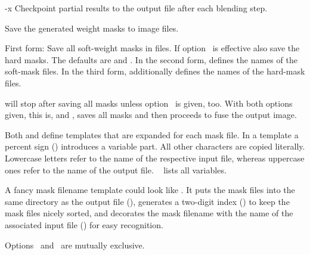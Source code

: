 \begin{codelist}
\ifenblend
    \label{opt:x}%
  \item[-x]
    Checkpoint partial results to the output
    file after each blending step.
\fi


\ifenfuse
    \label{opt:save-masks}%
  \item[\itempar{--save-masks~\textrm{(\oldstylefirst~form)}
      \\ --save-masks=\metavar{SOFT-MASK-TEMPLATE}~\textrm{(\oldstylesecond~form)}
      \\ --save-masks=\metavar{SOFT-MASK-TEMPLATE}:\feasiblebreak
      \metavar{HARD-MASK-TEMPLATE}~\textrm{(\oldstylethird~form)}}]\itemend
    Save the generated weight masks to image
    files.

    \begin{sloppypar}
      First form: Save all soft-weight masks in files.  If option~ is
      effective also save the hard masks.  The defaults are  and
      . In the second form,
       defines the names of the soft-mask files.  In the
      third form,  additionally defines the names of the
      hard-mask files.
    \end{sloppypar}

    \App{} will stop after saving
    all masks unless option~ is given, too.  With both options given, this is,
     and , \App{} saves all masks and then proceeds to
    fuse the output image.

    Both  and 
    define templates that are expanded for each mask file.  In a template a percent sign
    (\sample{\%}) introduces a variable part.  All other characters are copied literally.
    Lowercase letters refer to the name of the respective input file, whereas uppercase ones
    refer to the name of the output file.  \tableName~
    lists all variables.

    A fancy mask filename template could look like .  It puts the
    mask files into the same directory as the output file (), generates a two-digit
    index () to keep the mask files nicely sorted, and decorates the mask filename
    with the name of the associated input file () for easy recognition.

    Options~ and~ are mutually exclusive.
\fi
\end{codelist}


\ifenfuse
  
\fi



